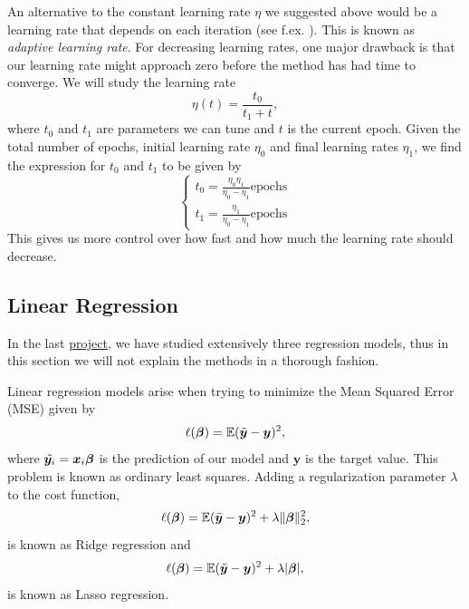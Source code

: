 \documentclass[aps,reprint,superscriptaddress,nofootinbib]{revtex4-2}
\begin{document}
    An alternative to the constant learning rate \(\eta\) we suggested above would be a learning rate that depends on each iteration (see f.ex. \cite{adaptive_learning_rate}). This is known as \textit{adaptive learning rate}. For decreasing learning rates, one major drawback is that our learning rate might approach zero before the method has had time to converge. We will study the learning rate
    \begin{equation*}
        \eta(t) = \frac{t_0}{t_1 + t},
    \end{equation*}
    where \(t_0\) and \(t_1\) are parameters we can tune and \(t\) is the current epoch. Given the total number of epochs, initial learning rate \(\eta_0\) and final learning rates \(\eta_1\), we find the expression for \(t_0\) and \(t_1\) to be given by
    \begin{equation*}
        \left\{
        \begin{array}{ll}
            t_0 = \frac{\eta_0 \eta_1}{\eta_0 - \eta_1} \text{epochs}  \\
            t_1 = \frac{\eta_1}{\eta_0 - \eta_1} \text{epochs}
        \end{array} 
        \right.
    \end{equation*}
    This gives us more control over how fast and how much the learning rate should decrease.
\subsection*{Linear Regression}
    In the last \href{https://github.com/jgci2000/FYS-STK4155-projects/blob/master/project_1/doc/report_project1.pdf}{project}, we have studied extensively three regression models, thus in this section we will not explain the methods in a thorough fashion. 
    
    Linear regression models arise when trying to minimize the Mean Squared Error (MSE) given by
    \begin{equation*}
        \ell(\bm{\beta}) = \mathbb{E} (\Tilde{\bm{y}} - \bm{y})^2,
    \end{equation*}
    where \(\Tilde{\bm{y}_i} = \bm{x}_i \bm{\beta}\) is the prediction of our model and \(\bm{y}\) is the target value. This problem is known as ordinary least squares. Adding a regularization parameter \(\lambda\) to the cost function,
    \begin{equation*}
        \ell(\bm{\beta}) = \mathbb{E} (\Tilde{\bm{y}} - \bm{y})^2 + \lambda \lVert \bm{\beta} \rVert_2^2,
    \end{equation*}
    is known as Ridge regression and  
    \begin{equation*}
        \ell(\bm{\beta}) = \mathbb{E} (\Tilde{\bm{y}} - \bm{y})^2 + \lambda | \bm{\beta} |,
    \end{equation*}
    is known as Lasso regression.
    
\end{document}
